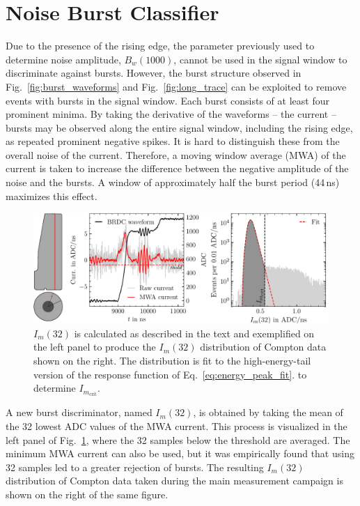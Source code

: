 \section{Noise Burst Classifier}
Due to the presence of the rising edge, the parameter previously used to determine noise amplitude, $B_w(1000)$, cannot be used in the signal window to discriminate against bursts. However, the burst structure observed in Fig.~\ref{fig:burst_waveforms} and Fig.~\ref{fig:long_trace} can be exploited to remove events with bursts in the signal window. Each burst consists of at least four prominent minima. By taking the derivative of the waveforms -- the current -- bursts may be observed along the entire signal window, including the rising edge, as repeated prominent negative spikes. It is hard to distinguish these from the overall noise of the current. Therefore, a moving window average (MWA) of the current is taken to increase the difference between the negative amplitude of the noise and the bursts. A window of approximately half the burst period (44\,ns) maximizes this effect. 
\begin{figure}[htb]
    \centering
    \includegraphics[width=6in]{figs/param/current_min_fit_6_9in.pdf}
    \caption{$I_m(32)$ is calculated as described in the text and exemplified on the left panel to produce the $I_m(32)$ distribution of Compton data shown on the right. The distribution is fit to the high-energy-tail version of the response function of Eq.~\ref{eq:energy_peak_fit}. to determine $I_{m_\text{crit}}$.}
    \label{fig:current_min_burst}
\end{figure}

A new burst discriminator, named $I_m(32)$, is obtained by taking the mean of the 32 lowest ADC values of the MWA current. This process is visualized in the left panel of Fig.~\ref{fig:current_min_burst}, where the 32 samples below the threshold are averaged. The minimum MWA current can also be used, but it was empirically found that using 32 samples led to a greater rejection of bursts. The resulting $I_m(32)$ distribution of Compton data taken during the main measurement campaign is shown on the right of the same figure.

